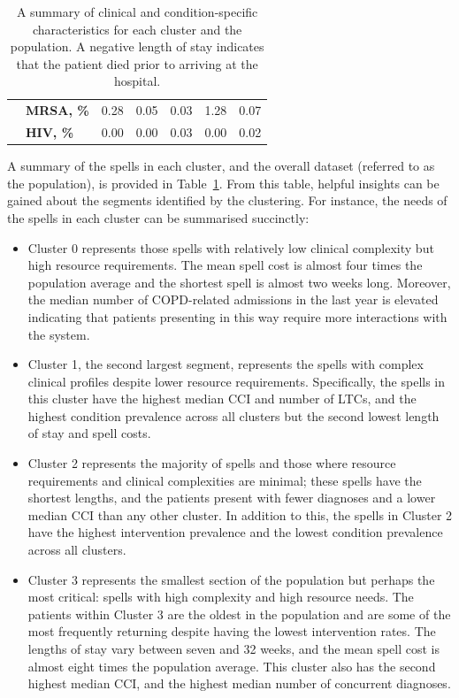 \documentclass[11pt]{article}
\begin{document}
\begin{table}
{\begin{tabular}{llrrrrr}
               & \textbf{MRSA, \%} &     0.28 &     0.05 &     0.03 &      1.28 &       0.07 \\
               & \textbf{HIV, \%} &     0.00 &     0.00 &     0.03 &      0.00 &       0.02 \\
        \bottomrule
        \end{tabular}
    }\caption{%
        A summary of clinical and condition-specific characteristics for each
        cluster and the population. A negative length of stay indicates that the
        patient died prior to arriving at the hospital.
    }\label{tab:summary}
\end{table}

A summary of the spells in each cluster, and the overall dataset (referred to as
the population), is provided in Table~\ref{tab:summary}. From this table,
helpful insights can be gained about the segments identified by the clustering.
For instance, the needs of the spells in each cluster can be summarised
succinctly:
\begin{itemize}
    \item Cluster 0 represents those spells with relatively low clinical
        complexity but high resource requirements. The mean spell cost is almost
        four times the population average and the shortest spell is almost two
        weeks long. Moreover, the median number of COPD-related admissions in
        the last year is elevated indicating that patients presenting in this
        way require more interactions with the system.
    \item Cluster 1, the second largest segment, represents the spells with
        complex clinical profiles despite lower resource requirements.
        Specifically, the spells in this cluster have the highest median CCI and
        number of LTCs, and the highest condition prevalence across all clusters
        but the second lowest length of stay and spell costs.
    \item Cluster 2 represents the majority of spells and those where resource
        requirements and clinical complexities are minimal; these spells have
        the shortest lengths, and the patients present with fewer diagnoses and
        a lower median CCI than any other cluster. In addition to this, the
        spells in Cluster 2 have the highest intervention prevalence and the
        lowest condition prevalence across all clusters.
    \item Cluster 3 represents the smallest section of the population but
        perhaps the most critical: spells with high complexity and high resource
        needs. The patients within Cluster 3 are the oldest in the population
        and are some of the most frequently returning despite having the lowest
        intervention rates. The lengths of stay vary between seven and 32 weeks,
        and the mean spell cost is almost eight times the population average.
        This cluster also has the second highest median CCI, and the highest
        median number of concurrent diagnoses.
\end{itemize}
\end{document}
